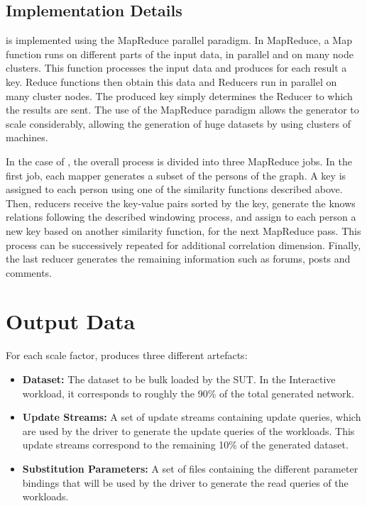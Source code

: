 \subsection{Implementation Details}

\datagen is implemented using the MapReduce parallel paradigm. In MapReduce, a
Map function runs on different parts of the input data, in parallel and on many
node clusters. This function processes the input data and produces for each
result a key. Reduce functions then obtain this data and Reducers run in
parallel on many cluster nodes. The produced key simply determines the Reducer
to which the results are sent. The use of the MapReduce paradigm allows the
generator to scale considerably, allowing the generation of huge datasets by
using clusters of machines.

In the case of \datagen, the overall process is divided into three MapReduce jobs.
In the first job, each mapper generates a subset of the persons of the graph. A
key is assigned to each person using one of the similarity functions described
above. Then, reducers receive the key-value pairs sorted by the key,
generate the knows relations following the described windowing process, and
assign to each person a new key based on another similarity function, for the
next MapReduce pass.  This process can be successively repeated for additional
correlation dimension.  Finally, the last reducer generates the remaining
information such as forums, posts and comments.

\section{Output Data}

For each scale factor, \datagen produces three different artefacts:
\begin{itemize}
  \item \textbf{Dataset:} The dataset to be bulk loaded by the SUT. In the Interactive workload, it corresponds to roughly the 90\% of the total generated network.
  \item \textbf{Update Streams:} A set of update streams containing update
    queries, which are used by the driver to generate the update queries of the
    workloads. This update
    streams correspond to the remaining 10\% of the generated dataset.
  \item \textbf{Substitution Parameters:} A set of files containing the
    different parameter bindings that will be used by the driver to generate the
    read queries of the workloads.
\end{itemize}

